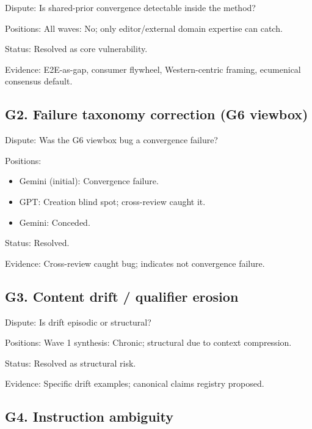 \documentclass[11pt,letterpaper]{article}
\begin{document}
\begin{reflist}
\item[Dispute:] Is shared-prior convergence detectable inside the method?
\item[Positions:] All waves: No; only editor/external domain expertise can catch.
\item[Status:] Resolved as core vulnerability.
\item[Evidence:] E2E-as-gap, consumer flywheel, Western-centric framing, ecumenical consensus default.
\end{reflist}

\subsection{G2. Failure taxonomy correction (G6 viewbox)}

\begin{reflist}
\item[Dispute:] Was the G6 viewbox bug a convergence failure?
\item[Positions:]~
  \begin{itemize}[nosep]
    \item Gemini (initial): Convergence failure.
    \item GPT: Creation blind spot; cross-review caught it.
    \item Gemini: Conceded.
  \end{itemize}
\item[Status:] Resolved.
\item[Evidence:] Cross-review caught bug; indicates not convergence failure.
\end{reflist}

\subsection{G3. Content drift / qualifier erosion}

\begin{reflist}
\item[Dispute:] Is drift episodic or structural?
\item[Positions:] Wave 1 synthesis: Chronic; structural due to context compression.
\item[Status:] Resolved as structural risk.
\item[Evidence:] Specific drift examples; canonical claims registry proposed.
\end{reflist}

\subsection{G4. Instruction ambiguity}
\end{document}
